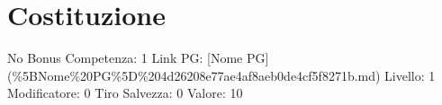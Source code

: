 \section{Costituzione}\label{costituzione}

\begin{description}
\tightlist
\item[Tags: STAT]
No Bonus Competenza: 1 Link PG: {[}Nome PG{]}
(\%5BNome\%20PG\%5D\%204d26208e77ae4af8aeb0de4cf5f8271b.md) Livello: 1
Modificatore: 0 Tiro Salvezza: 0 Valore: 10
\end{description}
